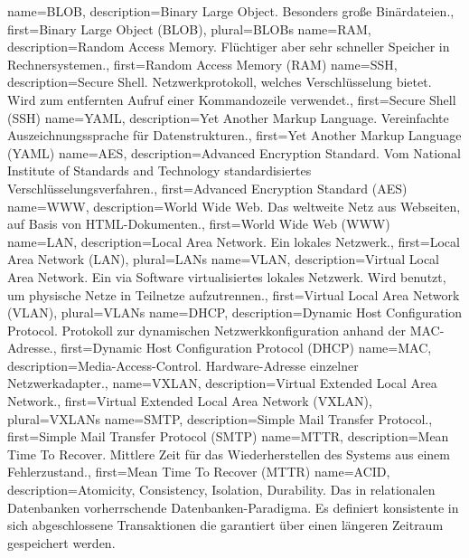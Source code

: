 {%
    name={BLOB},
    description={Binary Large Object. Besonders große Binärdateien.},
    first={Binary Large Object (BLOB)},
    plural={BLOBs}
}
{%
    name={RAM},
    description={Random Access Memory. Flüchtiger aber sehr schneller
    Speicher in Rechnersystemen.},
    first={Random Access Memory (RAM)}
}
{%
    name={SSH},
    description={Secure Shell. Netzwerkprotokoll, welches
    Verschlüsselung bietet. Wird zum entfernten Aufruf einer
    Kommandozeile verwendet.},
    first={Secure Shell (SSH)}
}
{%
    name={YAML},
    description={Yet Another Markup Language. Vereinfachte
    Auszeichnungssprache für Datenstrukturen.},
    first={Yet Another Markup Language (YAML)}
}
{%
    name={AES},
    description={Advanced Encryption Standard. Vom National Institute
    of Standards and Technology standardisiertes
    Verschlüsselungsverfahren.},
    first={Advanced Encryption Standard (AES)}
}
{%
    name={WWW},
    description={World Wide Web. Das weltweite Netz aus Webseiten, auf
    Basis von HTML-Dokumenten.},
    first={World Wide Web (WWW)}
}
{%
    name={LAN},
    description={Local Area Network. Ein lokales Netzwerk.},
    first={Local Area Network (LAN)},
    plural={LANs}
}
{%
    name={VLAN},
    description={Virtual Local Area Network. Ein via Software
    virtualisiertes lokales Netzwerk. Wird benutzt, um physische Netze in
    Teilnetze aufzutrennen.},
    first={Virtual Local Area Network (VLAN)},
    plural={VLANs}
}
{%
    name={DHCP},
    description={Dynamic Host Configuration Protocol. Protokoll zur
    dynamischen Netzwerkkonfiguration anhand der MAC-Adresse.},
    first={Dynamic Host Configuration Protocol (DHCP)}
}
{%
    name={MAC},
    description={Media-Access-Control. Hardware-Adresse einzelner
    Netzwerkadapter.},
}
{%
    name={VXLAN},
    description={Virtual Extended Local Area Network.},
    first={Virtual Extended Local Area Network (VXLAN)},
    plural={VXLANs}
}
{%
    name={SMTP},
    description={Simple Mail Transfer Protocol.},
    first={Simple Mail Transfer Protocol (SMTP)}
}
{%
    name={MTTR},
    description={Mean Time To Recover. Mittlere Zeit für das
    Wiederherstellen des Systems aus einem Fehlerzustand.},
    first={Mean Time To Recover (MTTR)}
}
{%
    name={ACID},
    description={Atomicity, Consistency, Isolation, Durability. Das in
    relationalen Datenbanken vorherrschende Datenbanken-Paradigma. Es
    definiert konsistente in sich abgeschlossene Transaktionen die
    garantiert über einen längeren Zeitraum gespeichert werden.}
}

